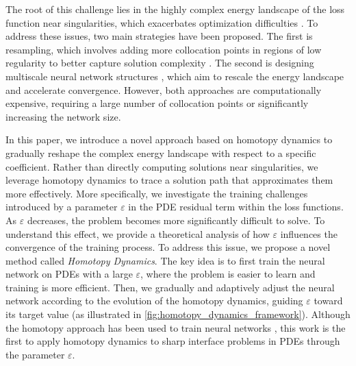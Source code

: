 The root of this challenge lies in the highly complex energy landscape of the loss function near singularities, which exacerbates optimization difficulties \cite{karniadakis2021physicsinformed,xu2024overview}. To address these issues, two main strategies have been proposed. The first is resampling, which involves adding more collocation points in regions of low regularity to better capture solution complexity \cite{wight2020solving,gao2024failure,ZHANG2025113561}. The second is designing multiscale neural network structures \cite{wang2020multi,liu2020multi,LIU2024112944,hao2024multiscale}, which aim to rescale the energy landscape and accelerate convergence. However, both approaches are computationally expensive, requiring a large number of collocation points or significantly increasing the network size.


In this paper, we introduce a novel approach based on homotopy dynamics to gradually reshape the complex energy landscape with respect to a specific coefficient. Rather than directly computing solutions near singularities, we leverage homotopy dynamics to trace a solution path that approximates them more effectively.
More specifically, we investigate the training challenges introduced by a parameter $\varepsilon$ in the PDE residual term within the loss functions.
As $\varepsilon$ decreases, the problem becomes more significantly difficult to solve. To understand this effect, we provide a theoretical analysis of how $\varepsilon$ influences the convergence of the training process. To address this issue, we propose a novel method called \textit{Homotopy Dynamics}. The key idea is to first train the neural network on PDEs with a large $\varepsilon$, where the problem is easier to learn and training is more efficient. Then, we gradually and adaptively adjust the neural network according to the evolution of the homotopy dynamics, guiding $\varepsilon$ toward its target value (as illustrated in \cref{fig:homotopy_dynamics_framework}). Although the homotopy approach has been used to train neural networks \cite{chen2019homotopy,yang2025homotopy}, this work is the first to apply homotopy dynamics to sharp interface problems in PDEs through the parameter $\varepsilon$.



